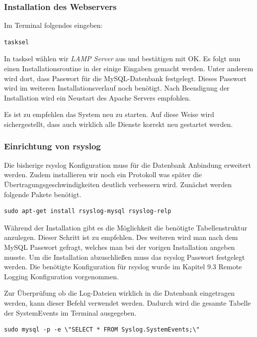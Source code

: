 \subsubsection{Installation des Webservers}
Im Terminal folgendes eingeben:

\begin{lstlisting}
tasksel
\end{lstlisting}

In tasksel wählen wir \textit{LAMP Server} aus und bestätigen mit OK. Es folgt nun einen Installationsroutine in der einige Eingaben gemacht werden. Unter anderem wird dort, dass Passwort für die MySQL-Datenbank festgelegt. Dieses Passwort wird im weiteren Installationsverlauf noch benötigt. Nach Beendigung der Installation wird ein Neustart des Apache Servers empfohlen.

\begin{informationnote}
	Es ist zu empfehlen das System neu zu starten. 	Auf diese Weise wird sichergestellt, dass auch wirklich alle Dienste korrekt neu gestartet werden.
\end{informationnote}

\subsubsection{Einrichtung von rsyslog}
Die bisherige rsyslog Konfiguration muss für die Datenbank Anbindung erweitert werden. Zudem installieren wir noch ein Protokoll was später die Übertragungsgeschwindigkeiten deutlich verbessern wird. Zunächst werden folgende Pakete benötigt.

\begin{lstlisting}
sudo apt-get install rsyslog-mysql rsyslog-relp
\end{lstlisting}

Während der Installation gibt es die Möglichkeit die benötigte Tabellenstruktur anzulegen. Dieser Schritt ist zu empfehlen. Des weiteren wird man nach dem MySQL Passwort gefragt, welches man bei der vorigen Installation angeben musste. Um die Installation abzuschließen muss das rsyslog Passwort festgelegt werden. Die benötigte Konfiguration für rsyslog wurde im Kapitel 9.3 Remote Logging Konfiguration vorgenommen.

Zur Überprüfung ob die Log-Dateien wirklich in die Datenbank eingetragen werden, kann dieser Befehl verwendet werden. Dadurch wird die gesamte Tabelle der SystemEvents im Terminal ausgegeben.

\begin{lstlisting}
sudo mysql -p -e \"SELECT * FROM Syslog.SystemEvents;\"
\end{lstlisting}

